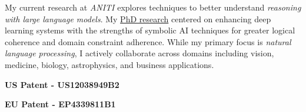 \documentclass[10pt,a4paper]{article}
\begin{document}
\sloppy

\spacedhrule{0.5em}{-0.7em}

\vspace{-0.2em}
    My current research at \emph{ANITI} explores techniques to better understand
    \emph{reasoning with large language models}. My
    \href{https://dspace.isical.ac.in/jspui/handle/10263/7608}{PhD research}
    centered on enhancing deep learning systems with the strengths of symbolic
    AI techniques for greater logical coherence and domain constraint adherence.
    While my primary focus is \emph{natural language processing}, I actively
    collaborate across domains including vision, medicine, biology,
    astrophysics, and business applications. 
\spacedhrule{1em}{-0.7em}




    {\textbf{US Patent - US12038949B2}}
    {}
\vspace{0.3em}

    {\textbf{EU Patent - EP4339811B1}}
    {}
\spacedhrule{1em}{-0.4em}

\end{document}

